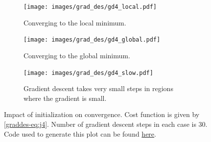 \documentclass{article}
\theoremstyle{definition}
\begin{document}
\begin{figure}[ht]
    \begin{subfigure}[ht]{\linewidth}
        \centering
        \texttt{[image: images/grad\_des/gd4\_local.pdf]}
        \caption{Converging to the local minimum.}
        \label{graddes-fig:gd4-local}
    \end{subfigure}%
    
    \begin{subfigure}[ht]{\linewidth}
        \centering
        \texttt{[image: images/grad\_des/gd4\_global.pdf]}
        \caption{Converging to the global minimum.}
        \label{graddes-fig:gd4-global}
    \end{subfigure}%
    
    \begin{subfigure}[ht]{\linewidth}
        \centering
        \texttt{[image: images/grad\_des/gd4\_slow.pdf]}
        \caption{Gradient descent takes very small steps in regions where the gradient is small.}
        \label{graddes-fig:gd4-slow}
    \end{subfigure}%
    
    \caption{Impact of initialization on convergence. Cost function is given by \eqref{graddes-eq:j4}. Number of gradient descent steps in each case is 30. Code used to generate this plot can be found \href{https://github.com/siavashaslanbeigi/ml_notes/blob/master/src/grad_des/basics.ipynb}{\color{blue} here}.}
    \label{graddes-fig:gd4-init}
\end{figure}



\end{document}
